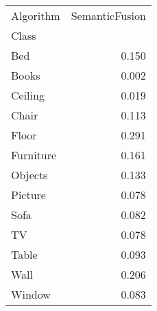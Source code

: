 \begin{tabular}{lr}
\toprule
Algorithm &  SemanticFusion \\
Class     &                 \\
\midrule
Bed       &           0.150 \\
Books     &           0.002 \\
Ceiling   &           0.019 \\
Chair     &           0.113 \\
Floor     &           0.291 \\
Furniture &           0.161 \\
Objects   &           0.133 \\
Picture   &           0.078 \\
Sofa      &           0.082 \\
TV        &           0.078 \\
Table     &           0.093 \\
Wall      &           0.206 \\
Window    &           0.083 \\
\bottomrule
\end{tabular}
